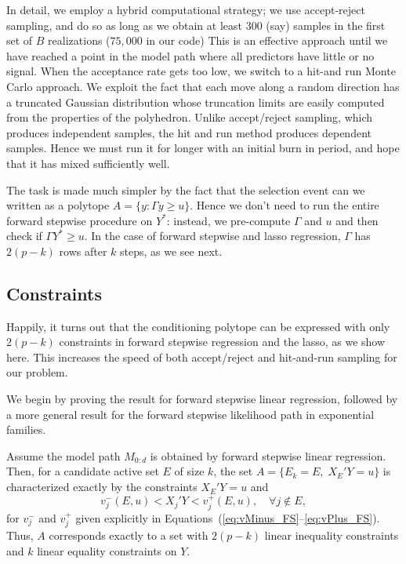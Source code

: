 \documentclass{article}
\begin{document}

In detail, we employ a hybrid computational strategy; we use accept-reject sampling, and do so as long as we obtain at least 300 (say) samples in the first set of $B$ realizations ($75,000$ in our code)  This is an effective approach until we have reached a point in the model path where all predictors have little or no signal. When the acceptance rate gets too low, we switch to a hit-and run Monte Carlo approach. We exploit the fact that each move along a random direction  has a truncated Gaussian distribution whose truncation limits are easily computed from the properties of the polyhedron. Unlike accept/reject sampling, which produces independent samples,  the hit and run method produces dependent samples. Hence we must run it for longer with an initial burn in period, and hope that it has mixed sufficiently well.

The task is made much simpler by the fact that the selection event can we written as a polytope $A=\{y: \Gamma y \geq u\}$. Hence we don't need to run the entire forward stepwise procedure on $Y^*$: instead, we pre-compute $\Gamma$ and $u$ and then check if $\Gamma Y^* \geq u$. In the case of forward stepwise and lasso regression, $\Gamma$ has $2(p-k)$ rows after $k$ steps, as we see next.

\subsection{Constraints}\label{sec:constrainsts}
Happily, it turns out that the conditioning polytope can be expressed with only $2(p-k)$ constraints in forward stepwise regression and the lasso, as we show here. This increases the speed of both accept/reject and hit-and-run sampling for our problem.

We begin by proving the result for forward stepwise linear regression, followed by a more general result for the forward stepwise likelihood path in exponential families.

\begin{theorem}
  Assume the model path $M_{0:d}$ is obtained by forward stepwise 
  linear regression. Then, for a candidate active set $E$ of size $k$, 
  the set $A = \{E_k = E, \;X_E'Y = u\}$ is characterized 
  exactly by the constraints $X_E'Y=u$ and
  \[
  v_j^-(E,u) < X_j'Y < v_j^+(E,u), \quad\forall j \notin E,
  \]
  for $v_j^-$ and $v_j^+$ given explicitly in
  Equations~(\ref{eq:vMinus_FS}--\ref{eq:vPlus_FS}).
  Thus, $A$ corresponds exactly to 
  a set with $2(p-k)$ linear inequality constraints and $k$
  linear equality constraints on $Y$.
\end{theorem}
\end{document}
